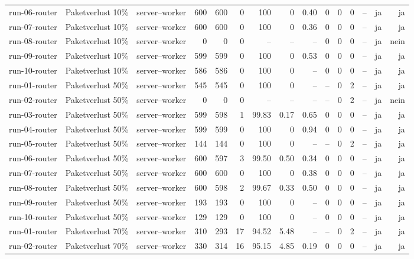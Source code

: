 \begin{table}
\begin{tabular}{l l p{3.2cm} r r r r r r r r r r r r}
run-06-router & Paketverlust 10\% & server--worker & 600 & 600 & 0 & 100 & 0 & 0.40 & 0 & 0 & 0 & -- & ja & ja \\
run-07-router & Paketverlust 10\% & server--worker & 600 & 600 & 0 & 100 & 0 & 0.36 & 0 & 0 & 0 & -- & ja & ja \\
run-08-router & Paketverlust 10\% & server--worker & 0 & 0 & 0 & -- & -- & -- & 0 & 0 & 0 & -- & ja & nein \\
run-09-router & Paketverlust 10\% & server--worker & 599 & 599 & 0 & 100 & 0 & 0.53 & 0 & 0 & 0 & -- & ja & ja \\
run-10-router & Paketverlust 10\% & server--worker & 586 & 586 & 0 & 100 & 0 & -- & 0 & 0 & 0 & -- & ja & ja \\
run-01-router & Paketverlust 50\% & server--worker & 545 & 545 & 0 & 100 & 0 & -- & -- & 0 & 2 & -- & ja & ja \\
run-02-router & Paketverlust 50\% & server--worker & 0 & 0 & 0 & -- & -- & -- & -- & 0 & 2 & -- & ja & nein \\
run-03-router & Paketverlust 50\% & server--worker & 599 & 598 & 1 & 99.83 & 0.17 & 0.65 & 0 & 0 & 0 & -- & ja & ja \\
run-04-router & Paketverlust 50\% & server--worker & 599 & 599 & 0 & 100 & 0 & 0.94 & 0 & 0 & 0 & -- & ja & ja \\
run-05-router & Paketverlust 50\% & server--worker & 144 & 144 & 0 & 100 & 0 & -- & -- & 0 & 2 & -- & ja & ja \\
run-06-router & Paketverlust 50\% & server--worker & 600 & 597 & 3 & 99.50 & 0.50 & 0.34 & 0 & 0 & 0 & -- & ja & ja \\
run-07-router & Paketverlust 50\% & server--worker & 600 & 600 & 0 & 100 & 0 & 0.38 & 0 & 0 & 0 & -- & ja & ja \\
run-08-router & Paketverlust 50\% & server--worker & 600 & 598 & 2 & 99.67 & 0.33 & 0.50 & 0 & 0 & 0 & -- & ja & ja \\
run-09-router & Paketverlust 50\% & server--worker & 193 & 193 & 0 & 100 & 0 & -- & 0 & 0 & 0 & -- & ja & ja \\
run-10-router & Paketverlust 50\% & server--worker & 129 & 129 & 0 & 100 & 0 & -- & 0 & 0 & 0 & -- & ja & ja \\
run-01-router & Paketverlust 70\% & server--worker & 310 & 293 & 17 & 94.52 & 5.48 & -- & -- & 0 & 2 & -- & ja & ja \\
run-02-router & Paketverlust 70\% & server--worker & 330 & 314 & 16 & 95.15 & 4.85 & 0.19 & 0 & 0 & 0 & -- & ja & ja \\

\end{tabular}
\end{table}
